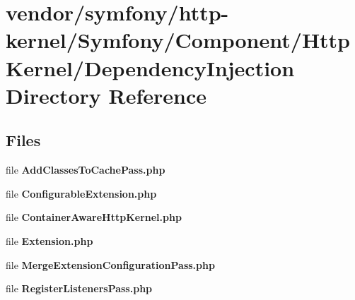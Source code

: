 \section{vendor/symfony/http-\/kernel/\+Symfony/\+Component/\+Http\+Kernel/\+Dependency\+Injection Directory Reference}
\label{dir_ebed56414319b811bae7558ec8bdee34}
\subsection*{Files}
\begin{DoxyCompactItemize}
\item 
file {\bf Add\+Classes\+To\+Cache\+Pass.\+php}
\item 
file {\bf Configurable\+Extension.\+php}
\item 
file {\bf Container\+Aware\+Http\+Kernel.\+php}
\item 
file {\bf Extension.\+php}
\item 
file {\bf Merge\+Extension\+Configuration\+Pass.\+php}
\item 
file {\bf Register\+Listeners\+Pass.\+php}
\end{DoxyCompactItemize}
